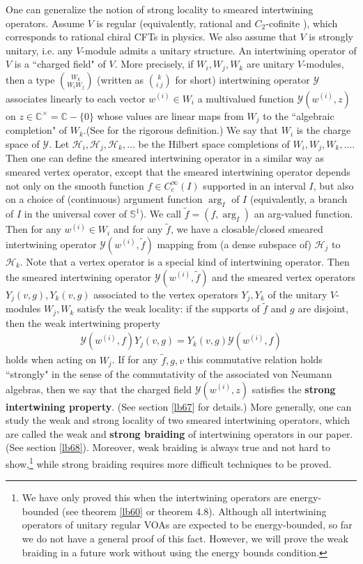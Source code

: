 \documentclass[11pt,b5paper,notitlepage]{article}
\theoremstyle{definition}
\theoremstyle{plain}
\newcommand{\mc}{\mathcal}
\newcommand{\wtd}{\widetilde}
\newcommand{\mbb}{\mathbb}
\numberwithin{equation}{subsection}
\begin{document}
One can generalize the notion of strong locality to smeared intertwining operators. Assume $V$ is regular (equivalently, rational and $C_2$-cofinite \cite{ABD04}), which corresponds to rational chiral CFTs in physics. We also assume that $V$ is strongly unitary, i.e. any $V$-module admits a unitary structure. An intertwining operator of $V$ is a ``charged field" of $V$. More precisely, if $W_i,W_j,W_k$ are unitary $V$-modules, then a type $W_k\choose W_iW_j$ (written as $k\choose i~j$ for short) intertwining operator $\mc Y$ associates linearly to each vector $w^{(i)}\in W_i$  a multivalued function $\mc Y(w^{(i)},z)$ on $z\in\mbb C^\times=\mbb C-\{0\}$ whose values are linear maps from $W_j$ to the ``algebraic completion" of $W_k$.(See \cite{FHL93} for the rigorous definition.)  We say that $W_i$ is the charge space of $\mc Y$.  Let $\mc H_i,\mc H_j,\mc H_k,\dots$ be the Hilbert space completions of $W_i,W_j,W_k,\dots$. Then one can define the smeared intertwining operator in a similar way as smeared vertex operator, except that the smeared intertwining operator depends not only on the smooth function $f\in C_c^\infty(I)$ supported in an interval $I$, but also on a choice of (continuous) argument function $\arg_I$ of $I$ (equivalently, a branch of $I$ in the universal cover of $\mbb S^1$). We call $\wtd f=(f,\arg_I)$ an arg-valued function. Then for any $w^{(i)}\in W_i$ and for any $\wtd f$, we have a closable/closed smeared intertwining operator $\mc Y(w^{(i)},\wtd f)$ mapping from (a dense subspace of) $\mc H_j$ to $\mc H_k$.  Note that a vertex operator is a special kind of intertwining operator. Then the  smeared intertwining operator $\mc Y(w^{(i)},\wtd f)$ and the smeared vertex operators $Y_j(v,g),Y_k(v,g)$ associated to the vertex operators $Y_j,Y_k$ of the unitary $V$-modules $W_j,W_k$ satisfy the weak locality: if the supports of $\wtd f$ and $g$ are disjoint, then the weak intertwining property
\begin{align*}
\mc Y(w^{(i)},f)Y_j(v,g)=Y_k(v,g)\mc Y(w^{(i)},f)
\end{align*}
holds when acting on $W_j$. If for any $\wtd f,g,v$ this commutative relation holds ``strongly" in the sense of the commutativity of the associated von Neumann algebras, then we say that the charged field $\mc Y(w^{(i)},z)$ satisfies the \textbf{strong intertwining property}. (See section \ref{lb67} for details.) More generally, one can study the weak and strong locality of two smeared intertwining operators, which are called the weak and \textbf{strong braiding} of intertwining operators in our paper. (See section \ref{lb68}). Moreover,  weak braiding is always true and not hard to show,\footnote{We have only proved this when the intertwining operators are energy-bounded (see theorem \ref{lb60} or \cite{Gui21a} theorem 4.8). Although all intertwining operators of unitary regular VOAs are expected to be energy-bounded, so far we do not have a general proof of this fact. However, we will prove the weak braiding in a future work without using the energy bounds condition.} while strong braiding requires more difficult techniques to be proved.
\end{document}
